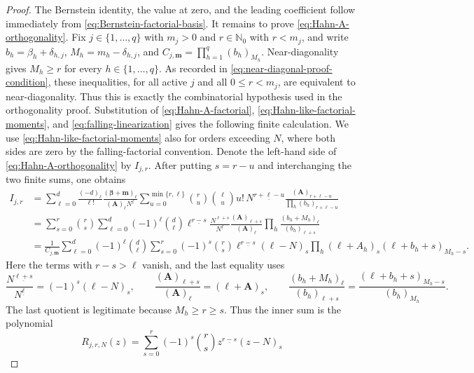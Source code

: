 \documentclass[10pt]{amsart}
\newcommand{\Nzero}{\mathbb N_0}
\newcommand{\A}{\boldsymbol A}
\newcommand{\bbeta}{\boldsymbol\beta}
\newcommand{\mm}{\boldsymbol m}
\newcommand{\fall}[2]{#1^{\underline{#2}}}
\theoremstyle{plain}
\theoremstyle{definition}
\theoremstyle{remark}
\begin{document}
\begin{proof}
The Bernstein identity, the value at zero, and the leading coefficient
follow immediately from \eqref{eq:Bernstein-factorial-basis}. It remains
to prove \eqref{eq:Hahn-A-orthogonality}. Fix
\(j\in\{1,\ldots,q\}\) with \(m_j>0\) and
\(r\in\Nzero\) with \(r<m_j\), and write
\(b_h=\beta_h+\delta_{h,j}\),
\(M_h=m_h-\delta_{h,j}\), and
\(C_{j,\mm}=\prod_{h=1}^q(b_h)_{M_h}\).
Near-diagonality gives \(M_h\ge r\) for every
\(h\in\{1,\ldots,q\}\). As recorded in
\eqref{eq:near-diagonal-proof-condition}, these inequalities, for all
active \(j\) and all \(0\le r<m_j\), are equivalent to
near-diagonality. Thus this is exactly the combinatorial hypothesis used
in the orthogonality proof. Substitution of
\eqref{eq:Hahn-A-factorial},
\eqref{eq:Hahn-like-factorial-moments}, and
\eqref{eq:falling-linearization} gives the following finite calculation.
We use \eqref{eq:Hahn-like-factorial-moments} also for orders exceeding
\(N\), where both sides are zero by the falling-factorial convention.
Denote the left-hand side of \eqref{eq:Hahn-A-orthogonality} by
\(I_{j,r}\).  After putting \(s=r-u\) and interchanging the two finite
sums, one obtains
\begin{align*}
 I_{j,r}
 &=\sum_{\ell=0}^d\frac{(-d)_\ell}{\ell!}
   \frac{(\bbeta+\mm)_\ell}{(\A)_\ell\fall{N}{\ell}}
   \sum_{u=0}^{\min\{r,\ell\}}\binom ru\binom\ell u u!\,
   \fall{N}{r+\ell-u}
   \frac{(\A)_{r+\ell-u}}{\prod_h(b_h)_{r+\ell-u}}\\
 &=\sum_{s=0}^r\binom rs\sum_{\ell=0}^d(-1)^\ell\binom d\ell
   \fall{\ell}{r-s}\frac{\fall{N}{\ell+s}}{\fall{N}{\ell}}
   \frac{(\A)_{\ell+s}}{(\A)_\ell}
   \prod_h\frac{(b_h+M_h)_\ell}{(b_h)_{\ell+s}}\\
 &=\frac1{C_{j,\mm}}\sum_{\ell=0}^d(-1)^\ell\binom d\ell
   \sum_{s=0}^r(-1)^s\binom rs\fall{\ell}{r-s}(\ell-N)_s
   \prod_h(\ell+A_h)_s(\ell+b_h+s)_{M_h-s}.
\end{align*}
Here the terms with \(r-s>\ell\) vanish, and the last equality uses
\begin{equation}
 \frac{\fall{N}{\ell+s}}{\fall{N}{\ell}}=(-1)^s(\ell-N)_s,
 \qquad
 \frac{(\A)_{\ell+s}}{(\A)_\ell}=(\ell+\A)_s,
 \qquad
 \frac{(b_h+M_h)_\ell}{(b_h)_{\ell+s}}
 =\frac{(\ell+b_h+s)_{M_h-s}}{(b_h)_{M_h}}.
 \label{eq:Hahn-A-cancellations}
\end{equation}
The last quotient is legitimate because \(M_h\ge r\ge s\).  Thus the
inner sum is the polynomial
\begin{equation}
 R_{j,r,N}(z)=\sum_{s=0}^r(-1)^s\binom rs\fall{z}{r-s}(z-N)_s

\end{equation}
\end{proof}
\end{document}

